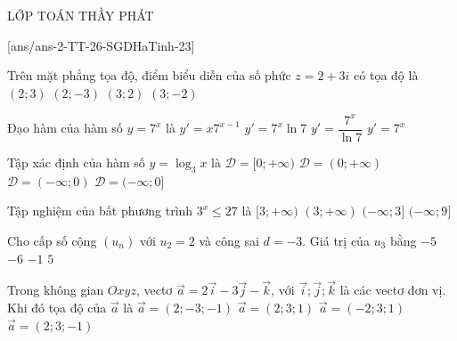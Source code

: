 \begin{name}
	{\tenchude}{\tendethi}{LỚP TOÁN THẦY PHÁT}{\thoigian}
\end{name}
\setcounter{ex}{0}
[ans/ans-2-TT-26-SGDHaTinh-23]

\begin{ex}%
	Trên mặt phẳng tọa độ, điểm biểu diễn của số phức $z=2+3i$ có tọa độ là
	\choice
	{\True $(2;3)$}
	{$(2;-3)$}
	{$(3;2)$}
	{$(3;-2)$}
\end{ex}

\begin{ex}%
	Đạo hàm của hàm số $y=7^x$ là
	\choice
	{$y'=x7^{x-1}$}
	{\True $y'=7^x\ln 7$}
	{$y'=\dfrac{7^x}{\ln 7}$}
	{$y'=7^x$}
\end{ex}

\begin{ex}%
	Tập xác định của hàm số $y=\log_3x$ là
	\choice
	{$\mathscr{D}=[0;+\infty)$}
	{\True $\mathscr{D}=(0;+\infty)$}
	{$\mathscr{D}=(-\infty;0)$}
	{$\mathscr{D}=(-\infty;0]$}
\end{ex}

\begin{ex}%
	Tập nghiệm của bất phương trình $3^x \leq 27$ là
	\choice
	{$[3;+\infty)$}
	{$(3;+\infty)$}
	{\True $(-\infty;3]$}
	{$(-\infty;9]$}
\end{ex}

\begin{ex}%
	Cho cấp số cộng $(u_n)$ với $u_2=2$ và công sai $d=-3$. Giá trị của $u_3$ bằng
	\choice
	{$-5$}
	{$-6$}
	{\True $-1$}
	{$5$}
\end{ex}

\begin{ex}%
	Trong không gian $Oxyz$, vectơ $\overrightarrow{a}=2\overrightarrow{i}-3\overrightarrow{j}-\overrightarrow{k}$, với $\overrightarrow{i};\overrightarrow{j};\overrightarrow{k}$ là các vectơ đơn vị. Khi đó tọa độ của $\overrightarrow{a}$ là
	\choice
	{\True $\overrightarrow{a}=(2;-3;-1)$}
	{$\overrightarrow{a}=(2;3;1)$}
	{$\overrightarrow{a}=(-2;3;1)$}
	{$\overrightarrow{a}=(2;3;-1)$}
\end{ex}

